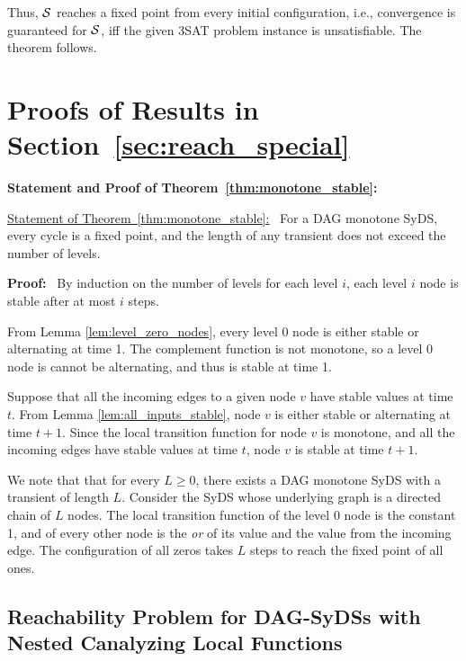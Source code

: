 \smallskip

Thus, $\mbox{$\mathcal{S}$}$ reaches a fixed point from every initial configuration, 
i.e.,  convergence is guaranteed for $\mbox{$\mathcal{S}$}$,
iff the given 3SAT problem instance is unsatisfiable.
The theorem follows.  \QED



\section{Proofs of Results in Section~\ref{sec:reach_special}}

\medskip

\noindent
\textbf{Statement and Proof of Theorem~\ref{thm:monotone_stable}:}

\medskip

\noindent
\underline{Statement of Theorem~\ref{thm:monotone_stable}:}~
For a DAG monotone SyDS, every cycle is a fixed point, 
and the length of any transient does not exceed the number of levels.

\medskip

\noindent
\textbf{Proof:}~ 
By induction on the number of levels for each level $i$, 
each level $i$ node is stable after at most $i$ steps.

From Lemma \ref{lem:level_zero_nodes}, every level 0 node is either
stable or alternating  at time 1.  The complement function is not
monotone, so a  level 0 node is cannot be alternating, and thus is
stable at time 1.

Suppose that all the incoming edges to a given node $v$ have stable
values at time $t$.  From Lemma \ref{lem:all_inputs_stable}, node
$v$ is either stable or alternating  at time $t+1$.  Since the local
transition function for node $v$ is monotone, and all the incoming
edges have stable values at time $t$, node $v$ is stable at time
$t+1$. \QED

\medskip

We note that that for every $L \geq 0$, there exists a DAG
monotone SyDS with a transient of length $L$.  Consider the SyDS
whose underlying graph is a directed chain of $L$ nodes.  The local
transition function of the level 0 node is the constant 1, and of
every other node is the {\em or} of its value and the value from
the incoming edge.  The configuration of all zeros takes $L$ steps
to reach the fixed point of all ones.


\subsection{Reachability Problem for DAG-SyDSs with Nested Canalyzing Local Functions}
\label{asec:reach_ncf}

